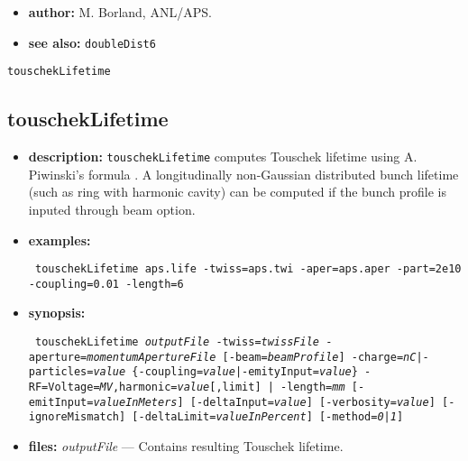\documentclass[11pt]{article}
\begin{document}
\begin{itemize}
\item {\bf author:} M. Borland, ANL/APS.

\item {\bf see also:} {\tt doubleDist6}
\end{itemize}


\newpage
\begin{center}{\Large\verb|touschekLifetime|}\end{center}
\subsection{touschekLifetime}

\begin{itemize}

\item {\bf description:} \verb|touschekLifetime| computes Touschek
  lifetime using A. Piwinski's formula \cite{Piwinski, Xiao2007a}. A
  longitudinally non-Gaussian distributed bunch lifetime (such as ring
  with harmonic cavity) can be computed if the bunch profile is
  inputed through beam option.

\item {\bf examples:}
\begin{flushleft}{\tt
touschekLifetime aps.life -twiss=aps.twi -aper=aps.aper -part=2e10 -coupling=0.01 -length=6
}\end{flushleft}

\item {\bf synopsis:}
\begin{flushleft}{\tt 
touschekLifetime {\em outputFile}
 -twiss={\em twissFile} -aperture={\em momentumApertureFile} [-beam={\em beamProfile}] 
 {-charge={\em nC}|-particles={\em value}} \{-coupling={\em value}|-emityInput={\em value}\}
 {-RF=Voltage={\em MV},harmonic={\em value}[,limit] | -length={\em mm}} 
 [-emitInput={\em valueInMeters}] [-deltaInput={\em value}] [-verbosity={\em value}]
 [-ignoreMismatch] [-deltaLimit={\em valueInPercent}] [-method={\em 0|1}]
}\end{flushleft}

\item {\bf files:}
{\em outputFile} --- Contains resulting Touschek lifetime.


\end{itemize}
\end{document}
